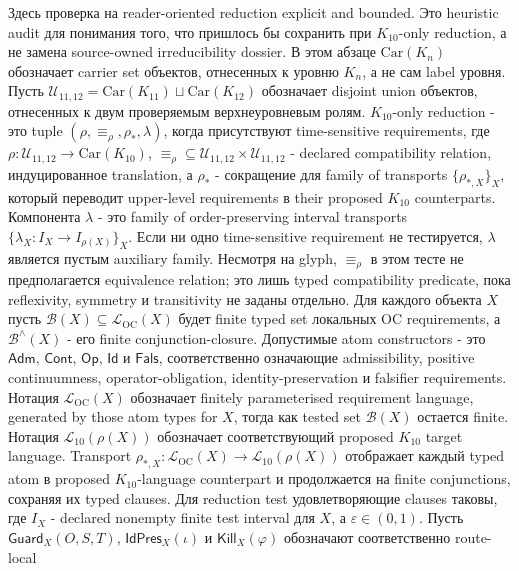 Здесь проверка на reader-oriented reduction explicit and bounded. Это
heuristic audit для понимания того, что пришлось бы сохранить при
\(K_{10}\)-only reduction, а не замена source-owned irreducibility dossier.
В этом абзаце \(\mathrm{Car}(K_n)\) обозначает carrier set объектов,
отнесенных к уровню \(K_n\), а не сам label уровня. Пусть
\(\mathcal{U}_{11,12}=\mathrm{Car}(K_{11})\sqcup \mathrm{Car}(K_{12})\)
обозначает disjoint union объектов, отнесенных к двум проверяемым
верхнеуровневым ролям. \(K_{10}\)-only reduction - это tuple
\((\rho,\equiv_{\rho},\rho_{\ast},\lambda)\), когда присутствуют
time-sensitive requirements, где
\(\rho:\mathcal{U}_{11,12}\to \mathrm{Car}(K_{10})\),
\(\equiv_{\rho}\subseteq\mathcal{U}_{11,12}\times\mathcal{U}_{11,12}\) -
declared compatibility relation, индуцированное translation, а
\(\rho_{\ast}\) - сокращение для family of transports
\(\{\rho_{\ast,X}\}_X\), который переводит upper-level requirements в their
proposed \(K_{10}\) counterparts. Компонента \(\lambda\) - это family of
order-preserving interval transports \(\{\lambda_X:I_X\to I_{\rho(X)}\}_X\).
Если ни одно time-sensitive requirement не тестируется, \(\lambda\) является
пустым auxiliary family. Несмотря на glyph, \(\equiv_{\rho}\) в этом тесте
не предполагается equivalence relation; это лишь typed compatibility
predicate, пока reflexivity, symmetry и transitivity не заданы отдельно.
Для каждого объекта \(X\) пусть \(\mathcal{B}(X)\subseteq\mathcal{L}_{\mathrm{OC}}(X)\)
будет finite typed set локальных OC requirements, а
\(\mathcal{B}^{\wedge}(X)\) - его finite conjunction-closure. Допустимые atom
constructors - это \(\mathsf{Adm}\), \(\mathsf{Cont}\), \(\mathsf{Op}\),
\(\mathsf{Id}\) и \(\mathsf{Fals}\), соответственно означающие
admissibility, positive continuumness, operator-obligation,
identity-preservation и falsifier requirements. Нотация
\(\mathcal{L}_{\mathrm{OC}}(X)\) обозначает finitely parameterised
requirement language, generated by those atom types for \(X\), тогда как
tested set \(\mathcal{B}(X)\) остается finite. Нотация
\(\mathcal{L}_{10}(\rho(X))\) обозначает соответствующий proposed \(K_{10}\)
target language. Transport
\(\rho_{\ast,X}:\mathcal{L}_{\mathrm{OC}}(X)\to\mathcal{L}_{10}(\rho(X))\)
отображает каждый typed atom в proposed \(K_{10}\)-language counterpart и
продолжается на finite conjunctions, сохраняя их typed clauses. Для reduction
test удовлетворяющие clauses таковы, где \(I_X\) - declared nonempty finite
test interval для \(X\), а \(\varepsilon\in(0,1)\). Пусть
\(\mathsf{Guard}_X(O,S,T)\), \(\mathsf{IdPres}_X(\iota)\) и
\(\mathsf{Kill}_X(\varphi)\) обозначают соответственно route-local
